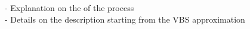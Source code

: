 - Explanation on the of the process \\

- Details on the description starting from the VBS approximation \\
